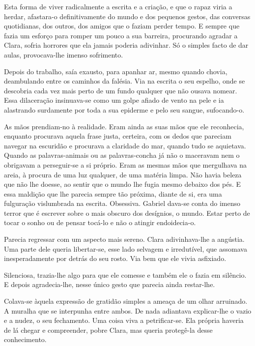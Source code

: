 Esta forma de viver radicalmente a escrita e a criação, e que o rapaz
viria a herdar, afastara-o definitivamente do mundo e dos pequenos
gestos, das conversas quotidianas, dos outros, dos amigos que o faziam
perder tempo. E sempre que fazia um esforço para romper um pouco a sua
barreira, procurando agradar a Clara, sofria horrores que ela jamais
poderia adivinhar. Só o simples facto de dar aulas, provocava-lhe imenso
sofrimento.

Depois do trabalho, saía exausto, para apanhar ar, mesmo quando chovia,
deambulando entre os caminhos da falésia. Via na escrita o seu espelho,
onde se descobria cada vez mais perto de um fundo qualquer que não
ousava nomear. Essa dilaceração insinuava-se como um golpe afiado de
vento na pele e ia alastrando surdamente por toda a sua epiderme e pelo
seu sangue, sufocando-o.

As mãos prendiam-no à realidade. Eram ainda as suas mãos que ele
reconhecia, enquanto procurava aquela frase justa, certeira, com os
dedos que pareciam navegar na escuridão e procurava a claridade do mar,
quando tudo se aquietava. Quando as palavras-animais ou as
palavras-concha já não o maceravam nem o obrigavam a perseguir-se a si
próprio. Eram as mesmas mãos que mergulhava na areia, à procura de uma
luz qualquer, de uma matéria limpa. Não havia beleza que não lhe doesse,
ao sentir que o mundo lhe fugia mesmo debaixo dos pés. E essa maldição
que lhe parecia sempre tão próxima, diante de si, era uma fulguração
vislumbrada na escrita. Obsessiva. Gabriel dava-se conta do imenso
terror que é escrever sobre o mais obscuro dos desígnios, o mundo. Estar
perto de tocar o sonho ou de pensar tocá-lo e não o atingir
endoidecia-o.

Parecia regressar com um aspecto mais sereno. Clara adivinhava-lhe a
angústia. Uma parte dele queria libertar-se, esse lado selvagem e
irredutível, que assomava inesperadamente por detrás do seu rosto. Via
bem que ele vivia asfixiado.

Silenciosa, trazia-lhe algo para que ele comesse e também ele o fazia em
silêncio. E depois agradecia-lhe, nesse único gesto que parecia ainda
restar-lhe.

Colava-se àquela expressão de gratidão simples a ameaça de um olhar
arruinado. A muralha que se interpunha entre ambos. De nada adiantava
explicar-lhe o vazio e a nudez, o seu fechamento. Uma coisa viva a
petrificar-se. Ela própria haveria de lá chegar e compreender, pobre
Clara, mas queria protegê-la desse conhecimento.

